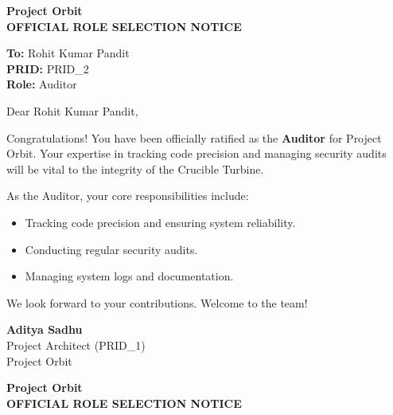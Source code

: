 \documentclass[11pt,a4paper]{article}
\begin{document}
\begin{center}
    \color{orbitblue}
    {\huge \textbf{Project Orbit}} \\
    \vspace{5mm}
    {\large \textbf{OFFICIAL ROLE SELECTION NOTICE}}
\end{center}

\vspace{10mm}

\noindent \textbf{To:} Rohit Kumar Pandit \\
\textbf{PRID:} PRID\_2 \\
\textbf{Role:} Auditor

\vspace{10mm}

\noindent Dear Rohit Kumar Pandit,

\vspace{5mm}

\noindent Congratulations! You have been officially ratified as the \textbf{Auditor} for Project Orbit. Your expertise in tracking code precision and managing security audits will be vital to the integrity of the Crucible Turbine.

\vspace{5mm}

\noindent As the Auditor, your core responsibilities include:
\begin{itemize}
    \item Tracking code precision and ensuring system reliability.
    \item Conducting regular security audits.
    \item Managing system logs and documentation.
\end{itemize}

\vspace{10mm}

\noindent We look forward to your contributions. Welcome to the team!

\vspace{15mm}

\begin{flushright}
    \textbf{Aditya Sadhu} \\
    Project Architect (PRID\_1) \\
    Project Orbit
\end{flushright}

\newpage

\begin{center}
    \color{orbitblue}
    {\huge \textbf{Project Orbit}} \\
    \vspace{5mm}
    {\large \textbf{OFFICIAL ROLE SELECTION NOTICE}}
\end{center}
\end{document}
